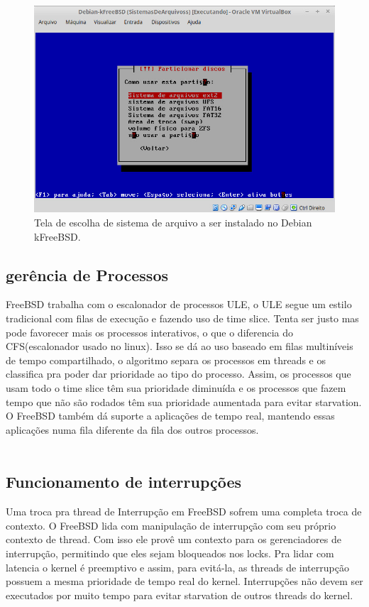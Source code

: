 \documentclass[conference]{IEEEtran}
\begin{document}
\begin{figure}[h!]
	\centering
	\includegraphics[scale=0.34]{SistemasArquivoskFreeBSD.jpeg}
	\caption{Tela de escolha de sistema de arquivo a ser instalado no Debian kFreeBSD.}
	\label{fig:SisAqrLinux}
\end{figure}

\subsection{gerência de Processos}\label{sec:BSDPROC}
FreeBSD trabalha com o escalonador de processos ULE, o ULE segue um estilo tradicional com filas de execução e fazendo uso de time slice. Tenta ser justo mas pode favorecer mais os processos interativos, o que o diferencia do CFS(escalonador usado no linux). Isso se dá ao uso baseado em filas multiníveis de tempo compartilhado, o algoritmo  separa os processos em threads e os classifica pra poder dar prioridade ao tipo do processo. Assim, os processos que usam todo o time slice têm sua prioridade diminuída e os processos que fazem tempo que não são rodados têm sua prioridade aumentada para evitar starvation.\\

O FreeBSD também dá suporte a aplicações de tempo real, mantendo essas aplicações numa fila diferente da fila dos outros processos.\cite{DesignImplementationFreeBSD}\\ \\

\subsection{Funcionamento de interrupções}\label{sec:BSDInt}
Uma troca pra thread de Interrupção em FreeBSD sofrem uma completa troca de contexto. O FreeBSD lida com manipulação de interrupção com seu próprio contexto de thread. Com isso ele provê um contexto para os gerenciadores de interrupção, permitindo que eles sejam bloqueados nos locks. Pra lidar com latencia o kernel é preemptivo e assim, para evitá-la, as threads de interrupção possuem a mesma prioridade de tempo real do kernel. Interrupções não devem ser executados por muito tempo para evitar starvation de outros threads do kernel. \\
\end{document}
